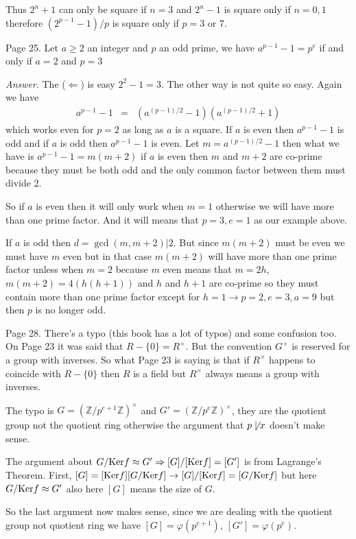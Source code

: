 \documentclass[aps,preprint,preprintnumbers,nofootinbib,showpacs,prd]{revtex4-1}
\newcommand{\nbea}{\begin{eqnarray*}}
\newcommand{\neea}{\end{eqnarray*}}
\begin{document}
Thus $2^n + 1$ can only be square if $n = 3$ and $2^n - 1$ is square only if $n = 0, 1$ therefore $(2^{p-1} - 1)/p$ is square only if $p = 3$ or $7$.

Page 25. Let $a \ge 2$ an integer and $p$ an odd prime, we have $a^{p-1} - 1 = p^e$ if and only if $a = 2$ and $p = 3$

{\it Answer}. The ($\Leftarrow$) is easy $2^2 - 1 = 3$. The other way is not quite so easy. Again we have 
%
\nbea
a^{p-1} - 1 & = & (a^{(p-1)/2} - 1)(a^{(p-1)/2} + 1)
\neea
%
which works even for $p=2$ as long as $a$ is a square. If $a$ is even then $a^{p-1} - 1$ is odd and if $a$ is odd then $a^{p-1} - 1$ is even. Let $m = a^{(p-1)/2} - 1$ then what we have is $a^{p-1} - 1 = m(m+2)$ if $a$ is even then $m$ and $m + 2$ are co-prime because they must be both odd and the only common factor between them must divide 2. 

So if $a$ is even then it will only work when $m = 1$ otherwise we will have more than one prime factor. And it will means that $p=3, e=1$ as our example above.

If $a$ is odd then $d = \gcd(m, m+2) | 2$. But since $m(m+2)$ must be even we must have $m$ even but in that case $m(m + 2)$ will have more than one prime factor unless when $m = 2$ because $m$ even means that $m=2h$, $m(m + 2) = 4(h(h + 1))$ and $h$ and $h + 1$ are co-prime so they must contain more than one prime factor except for $h = 1 \to p = 2, e = 3, a = 9$ but then $p$ is no longer odd.

Page 28. There's a typo (this book has a lot of typos) and some confusion too. On Page 23 it was said that $R - \{0\} = R^\times$. But the convention $G^\times$ is reserved for a group with inverses. So what Page 23 is saying is that if $R^{\times}$ happens to coincide with $R - \{0\}$ then $R$ is a field but $R^{\times}$ always means a group with inverses.

The typo is $G = (\mathbb{Z}/p^{e+1}\mathbb{Z})^{\times}$ and $G' = (\mathbb{Z}/p^{e}\mathbb{Z})^{\times}$, they are the quotient group not the quotient ring otherwise the argument that $p \not\mid x$ doesn't make sense. 

The argument about $G/{\rm Ker} f \approx G' \Rightarrow [G]/[{\rm Ker} f] = [G']$ is from Lagrange's Theorem. First, $[G] = [{\rm Ker} f] [G/{\rm Ker} f] \to [G]/[{\rm Ker} f] = [G/{\rm Ker} f]$ but here $G/{\rm Ker} f \approx G'$ also here $[G]$ means the size of $G$. 

So the last argument now makes sense, since we are dealing with the quotient group not quotient ring we have $[G] = \varphi(p^{e+1})$, $[G'] = \varphi(p^e)$. 
\end{document}
